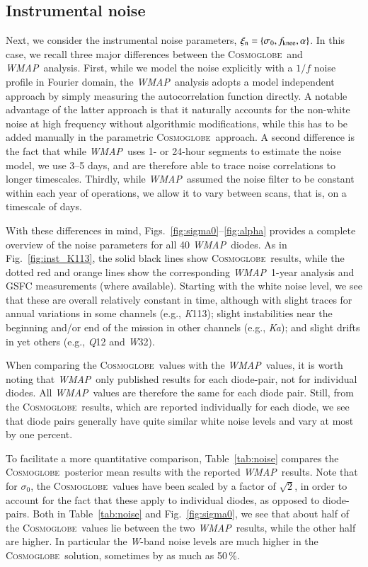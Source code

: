 \documentclass[twocolumn]{../../common/aa}
\def\WMAP{\emph{WMAP}}
\newcommand{\cosmoglobe}{\textsc{Cosmoglobe}}
\newcommand{\K}[0]{\textit K}
\newcommand{\Ka}[0]{\textit{Ka}}
\newcommand{\Q}[0]{\textit Q}
\newcommand{\W}[0]{\textit W}
\begin{document}
\subsection{Instrumental noise}
\label{sec:noise}

Next, we consider the instrumental noise parameters, $\xi_\mathrm{n}=\{\sigma_0, \fknee, \alpha\}$. In this case, we recall three major differences between the \cosmoglobe\ and \WMAP\ analysis. First, while we model the noise explicitly with a $1/f$ noise profile in Fourier domain, the \WMAP\ analysis adopts a model independent approach by simply measuring the autocorrelation function directly. A notable advantage of the latter approach is that it naturally accounts for the non-white noise at high frequency without algorithmic modifications, while this has to be added manually in the parametric \cosmoglobe\ approach. A second difference is the fact that while \WMAP\ uses 1- or 24-hour segments to estimate the noise model, we use 3--5 days, and are therefore able to trace noise correlations to longer timescales. Thirdly, while \WMAP\ assumed the noise filter to be constant within each year of operations, we allow it to vary between scans, that is, on a timescale of days.

With these differences in mind, Figs.~\ref{fig:sigma0}--\ref{fig:alpha} provides a complete overview of the noise parameters for all 40 \WMAP\ diodes. As in Fig.~\ref{fig:inst_K113}, the solid black lines show \cosmoglobe\ results, while the dotted red and orange lines show the corresponding \WMAP\ 1-year analysis  and GSFC measurements (where available). Starting with the white noise level, we see that these are overall relatively constant in time, although with slight traces for annual variations in some channels (e.g., \K113); slight instabilities near the beginning and/or end of the mission in other channels (e.g., \Ka); and slight drifts in yet others (e.g., \Q12 and \W32).

When comparing the \cosmoglobe\ values with the \WMAP\ values, it is worth noting that \WMAP\ only published results for each diode-pair, not for individual diodes. All \WMAP\ values are therefore the same for each diode pair. Still, from the \cosmoglobe\ results, which are reported individually for each diode, we see that diode pairs generally have quite similar white noise levels and vary at most by one percent.

To facilitate a more quantitative comparison, Table~\ref{tab:noise} compares the \cosmoglobe\ posterior mean results with the reported \WMAP\ results. Note that for $\sigma_0$, the \cosmoglobe\ values have been scaled by a factor of $\sqrt{2}$, in order to account for the fact that these apply to individual diodes, as opposed to diode-pairs. Both in Table~\ref{tab:noise} and Fig.~\ref{fig:sigma0}, we see that about half of the \cosmoglobe\ values lie between the two \WMAP\ results, while the other half are higher. In particular the \W-band noise levels are much higher in the \cosmoglobe\ solution, sometimes by as much as 50\,\%.
\end{document}
